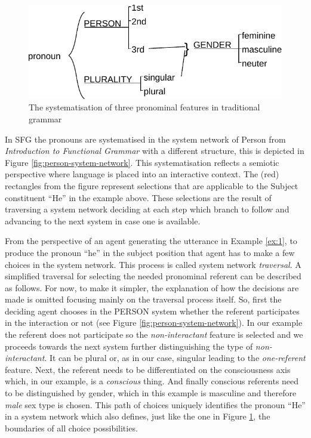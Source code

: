     \begin{figure}[!ht]
        \centering      
        \includegraphics[width=.56\textwidth]{Figures/Example/traditional-pronoun.pdf}
        \caption{The systematisation of three pronominal features in traditional grammar}
        \label{fig:traditional-pronoun}
    \end{figure}
    
    In SFG the pronouns are systematised in the system network of Person from \textit{Introduction to Functional Grammar} \citep[366]{Halliday2013} with a different structure, this is depicted in Figure \ref{fig:person-system-network}. This systematisation reflects a semiotic perspective where language is placed into an interactive context. The (red) rectangles from the figure represent selections that are applicable to the Subject constituent ``He'' in the example above. These selections are the result of traversing a system network deciding at each step which branch to follow and advancing to the next system in case one is available. 
    
    From the perspective of an agent generating the utterance in Example \ref{ex:1}, to produce the pronoun ``he'' in the subject position that agent has to make a few choices in the system network. This process is called system network \textit{traversal}. A simplified traversal for selecting the needed pronominal referent can be described as follows. For now, to make it simpler, the explanation of how the decisions are made is omitted focusing mainly on the traversal process itself. So, first the deciding agent chooses in the PERSON system whether the referent participates in the interaction or not (see Figure \ref{fig:person-system-network}). In our example the referent does not participate so the \textit{non-interactant} feature is selected and we proceeds towards the next system further distinguishing the type of \textit{non-interactant}. It can be plural or, as in our case, singular leading to the \textit{one-referent} feature. Next, the referent needs to be differentiated on the consciousness axis which, in our example, is a \textit{conscious} thing. And finally conscious referents need to be distinguished by gender, which in this example is masculine and therefore \textit{male} sex type is chosen. This path of choices uniquely identifies the pronoun ``He'' in a system network which also defines, just like the one in Figure \ref{fig:traditional-pronoun}, the boundaries of all choice possibilities.
     
